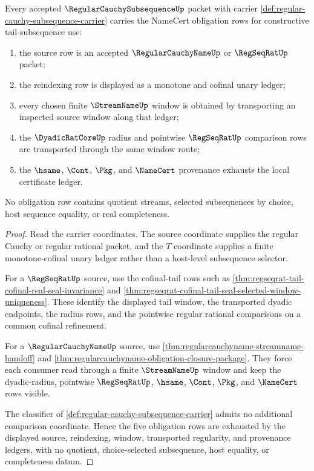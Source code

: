 \begin{theorem}
\label{thm:regular-cauchy-subsequence-namecert-obligations}
Every accepted $\RegularCauchySubsequenceUp$ packet with carrier \autoref{def:regular-cauchy-subsequence-carrier} carries the NameCert obligation rows for constructive tail-subsequence use:
\begin{enumerate}
\item the source row is an accepted $\RegularCauchyNameUp$ or $\RegSeqRatUp$ packet;
\item the reindexing row is displayed as a monotone and cofinal unary ledger;
\item every chosen finite $\StreamNameUp$ window is obtained by transporting an inspected source window along that ledger;
\item the $\DyadicRatCoreUp$ radius and pointwise $\RegSeqRatUp$ comparison rows are transported through the same window route;
\item the $\hsame$, $\Cont$, $\Pkg$, and $\NameCert$ provenance exhausts the local certificate ledger.
\end{enumerate}
No obligation row contains quotient streams, selected subsequences by choice, host sequence equality, or real completeness.
\end{theorem}
\begin{proof}
Read the carrier coordinates. The source coordinate supplies the regular Cauchy or regular rational packet, and the $T$ coordinate supplies a finite monotone-cofinal unary ledger rather than a host-level subsequence selector.

For a $\RegSeqRatUp$ source, use the cofinal-tail rows such as \autoref{thm:regseqrat-tail-cofinal-real-seal-invariance} and \autoref{thm:regseqrat-cofinal-tail-seal-selected-window-uniqueness}. These identify the displayed tail window, the transported dyadic endpoints, the radius rows, and the pointwise regular rational comparisons on a common cofinal refinement.

For a $\RegularCauchyNameUp$ source, use \autoref{thm:regularcauchyname-streamname-handoff} and \autoref{thm:regularcauchyname-obligation-closure-package}. They force each consumer read through a finite $\StreamNameUp$ window and keep the dyadic-radius, pointwise $\RegSeqRatUp$, $\hsame$, $\Cont$, $\Pkg$, and $\NameCert$ rows visible.

The classifier of \autoref{def:regular-cauchy-subsequence-carrier} admits no additional comparison coordinate. Hence the five obligation rows are exhausted by the displayed source, reindexing, window, transported regularity, and provenance ledgers, with no quotient, choice-selected subsequence, host equality, or completeness datum.
\end{proof}

